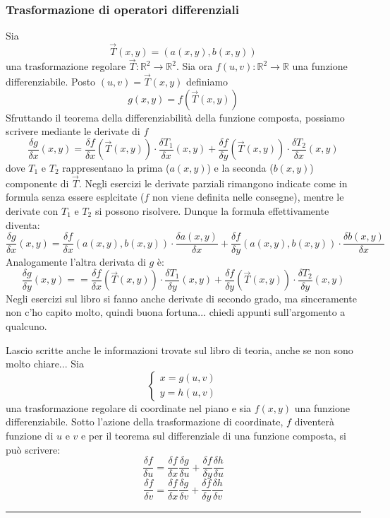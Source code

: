 \subsubsection*{Trasformazione di operatori differenziali}
\begin{tcolorbox}
Sia
\[
    \vec{T}(x,y) = (a(x,y), b(x,y))
\]
una trasformazione regolare $\vec{T}: \mathbb{R}^2 \rightarrow \mathbb{R}^2$.\newline
Sia ora $f(u,v) : \mathbb{R}^2 \rightarrow \mathbb{R}$ una funzione differenziabile. Posto $(u,v) = \vec{T}(x,y)$ definiamo 
\[
    g(x,y) = f(\vec{T}(x,y))
\] 
Sfruttando il teorema della differenziabilità della funzione composta, possiamo scrivere mediante le derivate di $f$ 
\[
    \frac{\delta g}{\delta x} (x,y) = \frac{\delta f}{\delta x}(\vec{T}(x,y)) \cdot \frac{\delta T_1}{\delta x}(x,y) + \frac{\delta f}{\delta y} (\vec{T}(x,y)) \cdot \frac{\delta T_2}{\delta x}(x,y)
\]
dove $T_1$ e $T_2$ rappresentano la prima ($a(x,y)$) e la seconda ($b(x,y)$) componente di $\vec{T}$. Negli esercizi le derivate parziali rimangono indicate come in formula senza essere esplcitate ($f$ non viene definita nelle consegne), mentre le derivate con $T_1$ e $T_2$ si possono risolvere. Dunque la formula effettivamente diventa:
\[
    \frac{\delta g}{\delta x} (x,y) = \frac{\delta f}{\delta x}(a(x,y), b(x,y)) \cdot \frac{\delta a(x,y)}{\delta x} + \frac{\delta f}{\delta y} (a(x,y), b(x,y)) \cdot \frac{\delta b(x,y)}{\delta x}
\]
Analogamente l'altra derivata di $g$ è:
\[
    \frac{\delta g}{\delta y}(x,y)= = \frac{\delta f}{\delta x}(\vec{T}(x,y)) \cdot \frac{\delta T_1}{\delta y}(x,y) + \frac{\delta f}{\delta y} (\vec{T}(x,y)) \cdot \frac{\delta T_2}{\delta y}(x,y)
\]
Negli esercizi sul libro si fanno anche derivate di secondo grado, ma sinceramente non c'ho capito molto, quindi buona fortuna... chiedi appunti sull'argomento a qualcuno.
\end{tcolorbox}
Lascio scritte anche le informazioni trovate sul libro di teoria, anche se non sono molto chiare...\newline
Sia 
\[
    \begin{cases}
        x = g(u,v)\\
        y=h(u,v)
    \end{cases}
\]
una trasformazione regolare di coordinate nel piano e sia $f(x,y)$ una funzione differenziabile. Sotto l'azione della trasformazione di coordinate, $f$ diventerà funzione di $u$ e $v$ e per il teorema sul differenziale di una funzione composta, si può scrivere:
\[
    \frac{\delta f}{\delta u} = \frac{\delta f}{\delta x} \frac{\delta g}{\delta u} + \frac{\delta f}{\delta y} \frac{\delta h}{\delta u}
\]
\[
    \frac{\delta f}{\delta v} = \frac{\delta f}{\delta x} \frac{\delta g}{\delta v} + \frac{\delta f}{\delta y} \frac{\delta h}{\delta v}
\]
\rule{\textwidth}{2pt}
